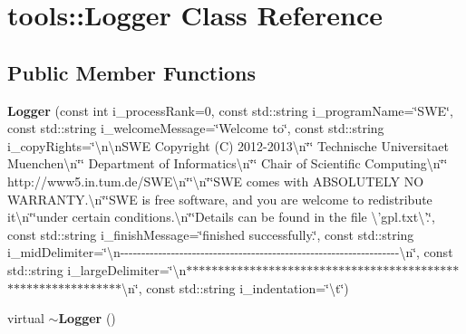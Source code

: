 \section{tools\-:\-:Logger Class Reference}
\label{classtools_1_1Logger}
\subsection*{Public Member Functions}
\begin{DoxyCompactItemize}
\item 
{\bf Logger} (const int i\-\_\-process\-Rank=0, const std\-::string i\-\_\-program\-Name=\char`\"{}S\-W\-E\char`\"{}, const std\-::string i\-\_\-welcome\-Message=\char`\"{}Welcome to\char`\"{}, const std\-::string i\-\_\-copy\-Rights=\char`\"{}\textbackslash{}n\textbackslash{}n\-S\-W\-E Copyright (C) 2012-\/2013\textbackslash{}n\char`\"{}\char`\"{}  Technische Universitaet Muenchen\textbackslash{}n\char`\"{}\char`\"{}  Department of Informatics\textbackslash{}n\char`\"{}\char`\"{}  Chair of Scientific Computing\textbackslash{}n\char`\"{}\char`\"{}  http\-://www5.\-in.\-tum.\-de/S\-W\-E\textbackslash{}n\char`\"{}\char`\"{}\textbackslash{}n\char`\"{}\char`\"{}S\-W\-E comes with A\-B\-S\-O\-L\-U\-T\-E\-L\-Y N\-O W\-A\-R\-R\-A\-N\-T\-Y.\textbackslash{}n\char`\"{}\char`\"{}S\-W\-E is free software, and you are welcome to redistribute it\textbackslash{}n\char`\"{}\char`\"{}under certain conditions.\textbackslash{}n\char`\"{}\char`\"{}Details can be found in the file \textbackslash{}'gpl.\-txt\textbackslash{}'.\char`\"{}, const std\-::string i\-\_\-finish\-Message=\char`\"{}finished successfully.\char`\"{}, const std\-::string i\-\_\-mid\-Delimiter=\char`\"{}\textbackslash{}n-\/-\/-\/-\/-\/-\/-\/-\/-\/-\/-\/-\/-\/-\/-\/-\/-\/-\/-\/-\/-\/-\/-\/-\/-\/-\/-\/-\/-\/-\/-\/-\/-\/-\/-\/-\/-\/-\/-\/-\/-\/-\/-\/-\/-\/-\/-\/-\/-\/-\/-\/-\/-\/-\/-\/-\/-\/-\/-\/-\/-\/-\/-\/-\/-\/-\/\textbackslash{}n\char`\"{}, const std\-::string i\-\_\-large\-Delimiter=\char`\"{}\textbackslash{}n$\ast$$\ast$$\ast$$\ast$$\ast$$\ast$$\ast$$\ast$$\ast$$\ast$$\ast$$\ast$$\ast$$\ast$$\ast$$\ast$$\ast$$\ast$$\ast$$\ast$$\ast$$\ast$$\ast$$\ast$$\ast$$\ast$$\ast$$\ast$$\ast$$\ast$$\ast$$\ast$$\ast$$\ast$$\ast$$\ast$$\ast$$\ast$$\ast$$\ast$$\ast$$\ast$$\ast$$\ast$$\ast$$\ast$$\ast$$\ast$$\ast$$\ast$$\ast$$\ast$$\ast$$\ast$$\ast$$\ast$$\ast$$\ast$$\ast$$\ast$$\ast$\textbackslash{}n\char`\"{}, const std\-::string i\-\_\-indentation=\char`\"{}\textbackslash{}t\char`\"{})
\item 
virtual {\bf $\sim$\-Logger} ()

\end{DoxyCompactItemize}
